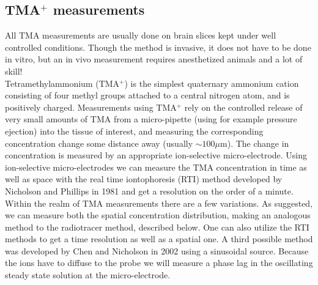\documentclass[a4paper,english, 12pt, twoside]{article}
\begin{document}
\subsection{TMA$^+$ measurements}
All TMA measurements are usually done on brain slices kept under well controlled conditions. 
Though the method is invasive, it does not have to be done in vitro, but an in vivo measurement requires anesthetized animals and a lot of skill!\\
Tetramethylammonium (TMA$^+$) is the simplest quaternary ammonium cation consisting of four methyl groups attached to a central nitrogen atom, and is positively charged. 
Measurements using TMA$^+$ rely on the controlled release of very small amounts of TMA from a micro-pipette (using for example pressure ejection) into the tissue of interest, and measuring the corresponding concentration change some distance away (usually $\sim100\mu$m). 
The change in concentration is measured by an appropriate ion-selective micro-electrode. 
Using ion-selective micro-electrodes we can measure the TMA concentration in time as well as space with the real time iontophoresis (RTI) method developed by Nicholson and Phillips in 1981 \cite{} and get a resolution on the order of a minute.\\
Within the realm of TMA measurements there are a few variations. 
As suggested, we can measure both the spatial concentration distribution, making an analogous method to the radiotracer method, described below. 
One can also utilize the RTI methods to get a time resolution as well as a spatial one. 
A third possible method was developed by Chen and Nicholson in 2002 \cite{chen2002measurement} using a sinusoidal source. 
Because the ions have to diffuse to the probe we will measure a phase lag in the oscillating steady state solution at the micro-electrode. 
\end{document}
